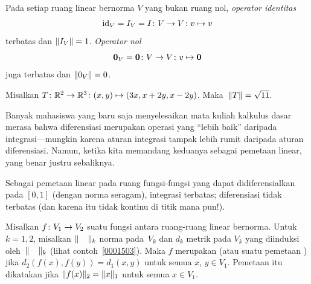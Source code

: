 \begin{exam} Pada setiap ruang linear bernorma $V$ yang bukan ruang nol,
\emph{operator identitas}
   \[ \operatorname{id}_{V} = I_V =I\colon V \rightarrow V \colon v \mapsto v \]
terbatas dan $\lVert I_V\rVert = 1$.
\emph{Operator nol}
   \[ \mathbf{0}_V = \mathbf{0}\colon V \rightarrow V\colon v \mapsto \mathbf{0} \]
juga terbatas dan $\lVert0_V\rVert = 0$.
\end{exam}

\begin{exam} Misalkan
$T \colon \mathbb{R}^2 \rightarrow \mathbb{R}^3\colon (x,y) \mapsto (3x, x + 2y, x - 2y)$.
Maka~$\lVert T\rVert = \sqrt{11}$.
\end{exam}

Banyak mahasiswa yang baru saja menyelesaikan mata kuliah kalkulus dasar merasa bahwa
diferensiasi merupakan operasi yang ``lebih baik'' daripada integrasi---mungkin
karena aturan integrasi tampak lebih rumit daripada aturan diferensiasi. Namun,
ketika kita memandang keduanya sebagai pemetaan linear, yang benar justru sebaliknya.

\begin{exam} Sebagai pemetaan linear pada ruang fungsi-fungsi yang dapat didiferensialkan
pada $[0,1]$ (dengan norma seragam), integrasi terbatas; diferensiasi tidak terbatas
(dan karena itu tidak kontinu di titik mana pun!).
\end{exam}


\begin{defn} Misalkan $f\colon V_1 \rightarrow V_2$ suatu fungsi antara ruang-ruang linear
bernorma. Untuk $k = 1,2$, misalkan $\lVert\hphantom{M}\rVert_k$ norma pada~$V_k$ dan $d_k$
metrik pada $V_k$ yang diinduksi oleh~$\lVert\hphantom{M}\rVert_k$ (lihat
contoh~\ref{0001503}). Maka $f$ merupakan
 (atau
suatu pemetaan ) jika $d_2(f(x),f(y)) = d_1(x,y)$ untuk semua
 $x$, $y \in V_1$. Pemetaan itu dikatakan
 jika $\lVert f(x)\rVert_2 = \lVert x\rVert_1$ untuk semua $x \in V_1$.
\end{defn}

